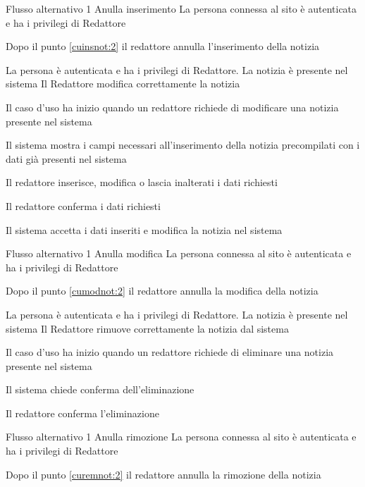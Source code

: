 %
{Flusso alternativo 1}%
{Anulla inserimento}%
{La persona connessa al sito è autenticata e ha i privilegi di Redattore}%
{\postNulle}%
{\begin{enumCU}
		\item Dopo il punto \ref{cuinsnot:2} il redattore annulla l'inserimento della notizia
	\end{enumCU}}%

\tabcuvspace

{}
{La persona è autenticata e ha i privilegi di Redattore. La notizia è presente nel sistema}
{Il Redattore modifica correttamente la notizia}
{\begin{enumCU}
	\item Il caso d'uso ha inizio quando un redattore richiede di modificare una notizia presente nel sistema 
	\item Il sistema mostra i campi necessari all'inserimento della notizia precompilati con i dati già presenti nel sistema
	\item Il redattore inserisce, modifica o lascia inalterati i dati richiesti \label{cumodnot:2}
	\item Il redattore conferma i dati richiesti
	\item Il sistema accetta i dati inseriti e modifica la notizia nel sistema
\end{enumCU}}
%
{Flusso alternativo 1}%
{Anulla modifica}%
{La persona connessa al sito è autenticata e ha i privilegi di Redattore}%
{\postNulle}%
{\begin{enumCU}
		\item Dopo il punto \ref{cumodnot:2} il redattore annulla la modifica della notizia
	\end{enumCU}}%

\tabcuvspace

{}
{La persona è autenticata e ha i privilegi di Redattore. La notizia è presente nel sistema}
{Il Redattore rimuove correttamente la notizia dal sistema}
{\begin{enumCU}
	\item Il caso d'uso ha inizio quando un redattore richiede di eliminare una notizia presente nel sistema
	\item Il sistema chiede conferma dell'eliminazione \label{curemnot:2}
	\item Il redattore conferma l'eliminazione
\end{enumCU}}
%
{Flusso alternativo 1}%
{Anulla rimozione}%
{La persona connessa al sito è autenticata e ha i privilegi di Redattore}%
{\postNulle}%
{\begin{enumCU}
		\item Dopo il punto \ref{curemnot:2} il redattore annulla la rimozione della notizia
	\end{enumCU}}%


